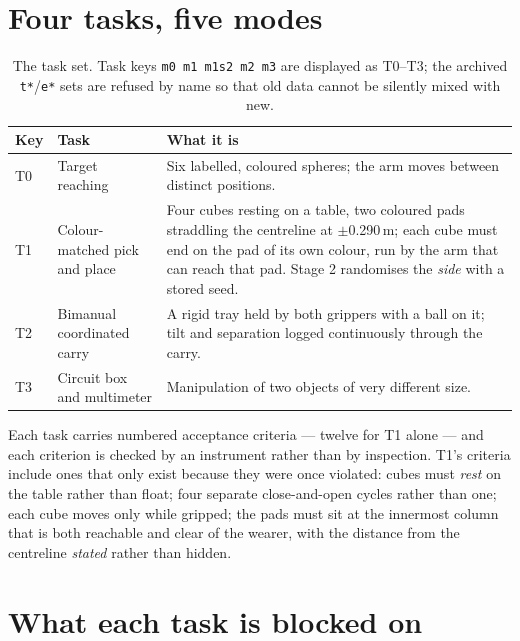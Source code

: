 \documentclass[11pt,a4paper,oneside]{report}
\newcommand{\code}[1]{\texttt{\small #1}}
\begin{document}
\section{Four tasks, five modes}

\begin{table}[H]
\centering
\small
\begin{tabularx}{\textwidth}{@{}llX@{}}
\toprule
\textbf{Key} & \textbf{Task} & \textbf{What it is} \\
\midrule
T0 & Target reaching & Six labelled, coloured spheres; the arm moves between distinct positions. \\
T1 & Colour-matched pick and place & Four cubes resting on a table, two coloured pads straddling the centreline at $\pm$0.290\,m; each cube must end on the pad of its own colour, run by the arm that can reach that pad. Stage 2 randomises the \emph{side} with a stored seed. \\
T2 & Bimanual coordinated carry & A rigid tray held by both grippers with a ball on it; tilt and separation logged continuously through the carry. \\
T3 & Circuit box and multimeter & Manipulation of two objects of very different size. \\
\bottomrule
\end{tabularx}
\caption{The task set. Task keys \code{m0 m1 m1s2 m2 m3} are displayed as
T0--T3; the archived \code{t*}/\code{e*} sets are refused by name so that old
data cannot be silently mixed with new.}
\end{table}

Each task carries numbered acceptance criteria --- twelve for T1 alone --- and
each criterion is checked by an instrument rather than by inspection. T1's
criteria include ones that only exist because they were once violated: cubes
must \emph{rest} on the table rather than float; four separate close-and-open
cycles rather than one; each cube moves only while gripped; the pads must sit
at the innermost column that is both reachable and clear of the wearer, with
the distance from the centreline \emph{stated} rather than hidden.

\section{What each task is blocked on}
\end{document}
